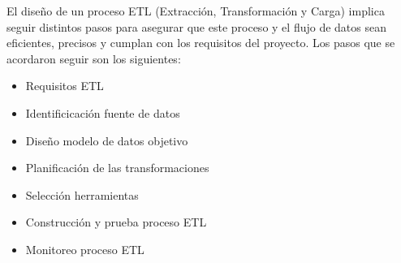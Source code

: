 El diseño de un proceso ETL (Extracción, Transformación y Carga) implica seguir distintos pasos para asegurar que este proceso y el flujo de datos sean eficientes, precisos y cumplan con los requisitos del proyecto. Los pasos que se acordaron seguir son los siguientes:
\begin{itemize}
    \item Requisitos ETL
    \item Identificicación fuente de datos
    \item Diseño modelo de datos objetivo
    \item Planificación de las transformaciones
    \item Selección herramientas
    \item Construcción y prueba proceso ETL
    \item Monitoreo proceso ETL
\end{itemize}
